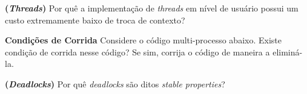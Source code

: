 \textbf{(\textit{Threads})} Por quê a implementação de \textit{threads} em nível de usuário possui um custo extremamente baixo de troca de contexto?


\textbf{Condições de Corrida} Considere o código multi-processo abaixo. Existe condição de corrida nesse código? Se sim, corrija o código de maneira a eliminá-la.


\textbf{(\textit{Deadlocks})} Por quê \textit{deadlocks} são ditos \textit{stable properties}?
